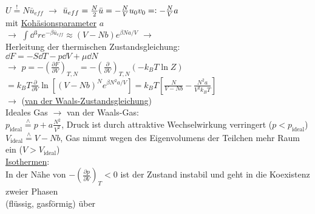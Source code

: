 \begin{tabbing}
\> $U \stackrel{!}{=} N \bar{u}_{eff}$ $\rightarrow$ $\bar{u}_{eff} = \frac{N}{2} \bar{u} = - \frac{N}{V} u_0 v_0 = \vcentcolon -\frac{N}{V}a$\\
\> mit \underline{Kohäsionsparameter} $a$\\
$\rightarrow$\> $\int\dd{}^3r e^{-\beta \bar{u}_{eff}} \approx (V - N b) e^{\beta N a /V}$ $\rightarrow$ \\
Herleitung der thermischen Zustandsgleichung:\\
\> $\dd{F} = - S \dd{T}-p\dd{V} + \mu\dd{N}$\\
$\rightarrow$\> $p = -\left(\frac{\partial F}{\partial V}\right)_{T,N} = - \left(\frac{\partial}{\partial V}\right)_{T,N}(-k_B T \ln Z)$\\
\> $ = k_B T \frac{\partial}{\partial V} \ln \left[(V - N b)^N e^{\beta N^2 a / V}\right] = k_B T \left[\frac{N}{V - N b} - \frac{N^2 a}{V^2 k_B T}\right]$\\
$\rightarrow$\>  (\underline{van der Waals-Zustandsgleichung})\\
Ideales Gas $\rightarrow$ van der Waals-Gas:\\
\> $p_{\text{ideal}} \stackrel{\wedge}{=} p + a \frac{N^2}{V^2}$, Druck ist durch attraktive Wechselwirkung verringert ($p < p_{\text{ideal}}$)\\
\> $V_{\text{ideal}} \stackrel{\wedge}{=} V - N b$, Gas nimmt wegen des Eigenvolumens der Teilchen mehr Raum ein ($V > V_{\text{ideal}}$)\\
\underline{Isothermen}:\\
In der Nähe von $-\left(\frac{\partial p}{\partial V}\right)_T < 0$ ist der Zustand instabil und geht in die Koexistenz zweier Phasen\\
(flüssig, gasförmig) über
\end{tabbing}
